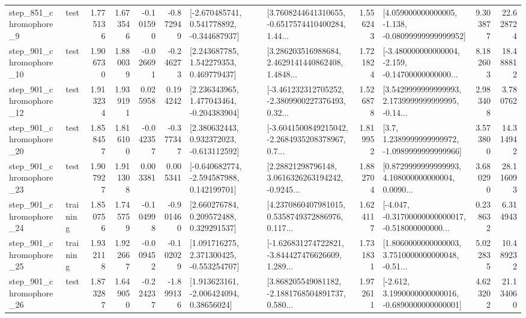 \begin{tabular}{llrrrrllrlrr}
   step\_851\_chromophore\_9 &      test &      1.775136 &    1.673546 &     -0.101590 & -0.872949 &   [-2.670485741, 0.541778892, -0.344687937] &  [3.7608244641310655, -0.6517574410400284, 1.44... &       1.556243 &  [4.059000000000005, -1.138, -0.08099999999999952] &            9.303877 &         22.628724 \\
  step\_901\_chromophore\_10 &      test &      1.906730 &    1.880039 &     -0.026691 & -0.246273 &     [2.243687785, 1.542279353, 0.469779437] &  [3.286203516988684, 2.4629141440862408, 1.4848... &       1.721824 &  [-3.480000000000004, -2.159, -0.14700000000000... &            8.182603 &         18.488812 \\
  step\_901\_chromophore\_12 &      test &      1.913234 &    1.939191 &      0.025958 &  0.194242 &    [2.236343965, 1.477043464, -0.204383904] &  [-3.461232312705252, -2.3809900227376493, 0.32... &       1.526878 &  [3.5429999999999993, 2.1739999999999995, -0.14... &            2.983408 &          3.780762 \\
  step\_901\_chromophore\_20 &      test &      1.858457 &    1.816100 &     -0.042357 & -0.377347 &    [2.380632443, 0.932372023, -0.613112592] &  [-3.6041500849215042, -2.2684935208378967, 0.7... &       1.819952 &     [3.7, 1.2389999999999972, -1.0989999999999966] &            3.573800 &         14.314942 \\
  step\_901\_chromophore\_23 &      test &      1.907927 &    1.911308 &      0.003381 &  0.005341 &   [-0.640682774, -2.594587988, 0.142199701] &  [2.28821298796148, 3.0616326263194242, -0.9245... &       1.882704 &  [0.8729999999999993, 4.108000000000004, 0.0090... &            3.680290 &         28.116093 \\
  step\_901\_chromophore\_24 &  training &      1.850756 &    1.745759 &     -0.104998 & -0.901460 &     [2.660276784, 0.209572488, 0.329291537] &  [4.2370860407981015, 0.5358749372886976, 0.117... &       1.624117 &  [-4.047, -0.31700000000000017, -0.518000000000... &            0.238632 &          6.314943 \\
  step\_901\_chromophore\_25 &  training &      1.932118 &    1.922667 &     -0.009452 & -0.102029 &    [1.091716275, 2.371300425, -0.553254707] &  [-1.626831274722821, -3.844427476626609, 1.289... &       1.731831 &  [1.8060000000000003, 3.7510000000000048, -0.51... &            5.022835 &         10.489232 \\
  step\_901\_chromophore\_26 &      test &      1.873287 &    1.649050 &     -0.224237 & -1.899136 &     [1.913623161, -2.006424094, 0.38656024] &  [3.868205549081182, -2.1881768504891737, 0.580... &       1.972611 &  [-2.612, 3.1990000000000016, -0.6890000000000001] &            4.623202 &         21.134060 \\

\end{tabular}

